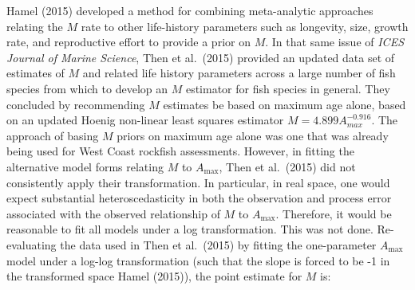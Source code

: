 \documentclass[11pt,
  english,
  a4paper,
]{article}
\begin{document}
\leavevmode\tagmcend\tagstructend


Hamel {(2015)\leavevmode\tagmcend\tagstructend} developed a method for combining meta-analytic approaches relating the {\(M\)\leavevmode\tagmcend\tagstructend} rate to other life-history parameters such as longevity, size, growth rate, and reproductive effort to provide a prior on {\(M\)\leavevmode\tagmcend\tagstructend}. In that same issue of \emph{ICES Journal of Marine Science}, Then et al.~{(2015)\leavevmode\tagmcend\tagstructend} provided an updated data set of estimates of {\(M\)\leavevmode\tagmcend\tagstructend} and related life history parameters across a large number of fish species from which to develop an {\(M\)\leavevmode\tagmcend\tagstructend} estimator for fish species in general. They concluded by recommending {\(M\)\leavevmode\tagmcend\tagstructend} estimates be based on maximum age alone, based on an updated Hoenig non-linear least squares estimator {\(M=4.899A^{-0.916}_{max}\)\leavevmode\tagmcend\tagstructend}. The approach of basing {\(M\)\leavevmode\tagmcend\tagstructend} priors on maximum age alone was one that was already being used for West Coast rockfish assessments. However, in fitting the alternative model forms relating {\(M\)\leavevmode\tagmcend\tagstructend} to {\(A_{\text{max}}\)\leavevmode\tagmcend\tagstructend}, Then et al.~{(2015)\leavevmode\tagmcend\tagstructend} did not consistently apply their transformation. In particular, in real space, one would expect substantial heteroscedasticity in both the observation and process error associated with the observed relationship of {\(M\)\leavevmode\tagmcend\tagstructend} to {\(A_{\text{max}}\)\leavevmode\tagmcend\tagstructend}. Therefore, it would be reasonable to fit all models under a log transformation. This was not done. Re-evaluating the data used in Then et al.~{(2015)\leavevmode\tagmcend\tagstructend} by fitting the one-parameter {\(A_{\text{max}}\)\leavevmode\tagmcend\tagstructend} model under a log-log transformation (such that the slope is forced to be -1 in the transformed space Hamel {(2015)\leavevmode\tagmcend\tagstructend}), the point estimate for {\(M\)\leavevmode\tagmcend\tagstructend} is:
\end{document}
